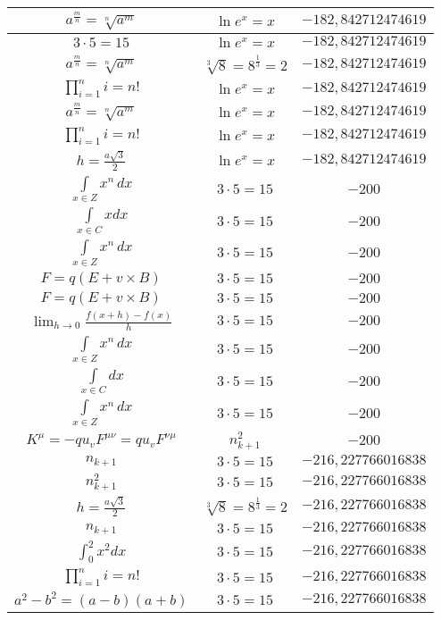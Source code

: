 \documentclass{article}
\begin{document}
\begin{flushleft}
\begin{longtable}{|c|c|c|}
$a^{\frac{m}{n}}=\sqrt[n]{a^{m}}$ & $\ln e^x=x$ & $-182,842712474619$ \\ \hline 
$3\cdot 5=15$ & $\ln e^x=x$ & $-182,842712474619$ \\ \hline 
$a^{\frac{m}{n}}=\sqrt[n]{a^{m}}$ & $\sqrt[3]{8}=8^{\frac{1}{3}}=2$ & $-182,842712474619$ \\ \hline 
$\prod_{i=1}^ni=n!$ & $\ln e^x=x$ & $-182,842712474619$ \\ \hline 
$a^{\frac{m}{n}}=\sqrt[n]{a^{m}}$ & $\ln e^x=x$ & $-182,842712474619$ \\ \hline 
$\prod_{i=1}^ni=n!$ & $\ln e^x=x$ & $-182,842712474619$ \\ \hline 
$h=\frac{a\sqrt{3}}{2}$ & $\ln e^x=x$ & $-182,842712474619$ \\ \hline 
$\int \limits_{x\in Z}\!x^{n}\,dx$ & $3\cdot 5=15$ & $-200$ \\ \hline 
$\int \limits_{x\in C}xdx$ & $3\cdot 5=15$ & $-200$ \\ \hline 
$\int \limits_{x\in Z}\!x^{n}\,dx$ & $3\cdot 5=15$ & $-200$ \\ \hline 
$F=q\left(E+v\times B\right)$ & $3\cdot 5=15$ & $-200$ \\ \hline 
$F=q\left(E+v\times B\right)$ & $3\cdot 5=15$ & $-200$ \\ \hline 
$\lim_{h\to0}\frac{f(x+h)-f(x)}{h}$ & $3\cdot 5=15$ & $-200$ \\ \hline 
$\int \limits_{x\in Z}\!x^{n}\,dx$ & $3\cdot 5=15$ & $-200$ \\ \hline 
$\int \limits_{x\in C}dx$ & $3\cdot 5=15$ & $-200$ \\ \hline 
$\int \limits_{x\in Z}\!x^{n}\,dx$ & $3\cdot 5=15$ & $-200$ \\ \hline 
$K^\mu=-qu_vF^{\mu\nu}=qu_vF^{\nu\mu}$ & $n_{k+1}^2$ & $-200$ \\ \hline 
$n_{k+1}$ & $3\cdot 5=15$ & $-216,227766016838$ \\ \hline 
$n_{k+1}^2$ & $3\cdot 5=15$ & $-216,227766016838$ \\ \hline 
$h=\frac{a\sqrt{3}}{2}$ & $\sqrt[3]{8}=8^{\frac{1}{3}}=2$ & $-216,227766016838$ \\ \hline 
$n_{k+1}$ & $3\cdot 5=15$ & $-216,227766016838$ \\ \hline 
$\int _0^2x^2dx$ & $3\cdot 5=15$ & $-216,227766016838$ \\ \hline 
$\prod_{i=1}^ni=n!$ & $3\cdot 5=15$ & $-216,227766016838$ \\ \hline 
$a^2-b^2=(a-b)(a+b)$ & $3\cdot 5=15$ & $-216,227766016838$ \\ \hline 

\end{longtable}
\end{flushleft}
\end{document}
